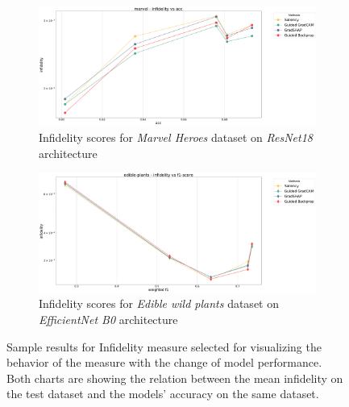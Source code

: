 \begin{figure}[h]
  \centering
 \begin{subfigure}{.49\textwidth}
    \centering
    \includegraphics[width=\textwidth]{results/metrics/resnet18-marvel-infidelity vs acc.png}
    \caption{Infidelity scores for \textit{Marvel Heroes} dataset on \textit{ResNet18} architecture}\label{fig:resnet-inf-marvel}
\end{subfigure}
 \begin{subfigure}{.49\textwidth}
    \centering
    \includegraphics[width=\textwidth]{results/metrics/efficientnet-edible-plants-infidelity vs f1-score.png}
    \caption{Infidelity scores for \textit{Edible wild plants} dataset on \textit{EfficientNet B0} architecture}\label{fig:efficientnet-inf-edible-plants}
\end{subfigure}

 \caption{Sample results for Infidelity measure selected for visualizing the behavior of the measure with the change of model performance. Both charts are showing the relation between the mean infidelity on the test dataset and the models' accuracy on the same dataset.}\label{fig:inf-metrics-examples}
\end{figure}

\vspace{\baselineskip}

